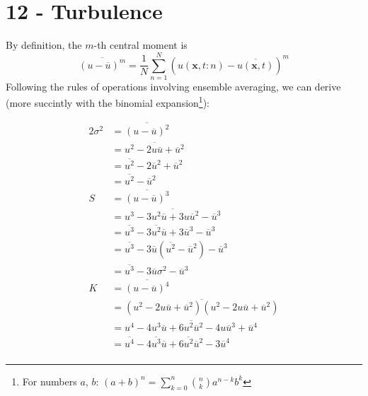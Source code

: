 \documentclass[a4paper]{article}
\begin{document}
\maketitle

\newpage
\tableofcontents

\newpage
\section{12 - Turbulence}


By definition, the \(m\)-th central moment is
\[
	\overline{\!\left( u - \overline{u} \right)^{m}} = \frac{1}{N} \sum_{n=1}^{N} \!\left( u \!\left( \bm{x}, t : n \right) - \overline{u \!\left( \bm{x}, t \right) } \right)^{m}
\]
Following the rules of operations involving ensemble averaging, we can derive (more succintly with the binomial expansion\footnote{For numbers \(a\), \(b\): \( (a + b)^n = \sum_{k=0}^{n} \binom{n}{k} a^{n-k} b^k \)}):

\begin{alignat*}{2}
	\sigma^{2} & = \overline{\!\left(u - \overline{u} \right)^{2}} \\
	     & = \overline{u^{2} - 2u \overline{u} + \overline{u}^{2} } \\
	     & = \overline{u^{2}} - 2 \overline{u}^{2} + \overline{u}^{2}  \\
	     & = \boxed{ \overline{u^{2}} - \overline{u}^{2} } \\
	   S & = \overline{\!\left( u - \overline{u} \right)^{3} }  \\
	     & = \overline{u^{3} - 3u^{2}\overline{u} + 3u \overline{u}^{2} - \overline{u}^{3}} \\
	     & = \overline{u^{3}} - 3 \overline{u^{2}} \overline{u} + 3 \overline{u}^{3} - \overline{u}^{3} \\
	     & = \overline{u^{3}} - 3 \overline{u} \!\left( \overline{u^{2}} - \overline{u}^{2} \right) - \overline{u}^{3} \\
	     & = \boxed{ \overline{u^{3}} - 3 \overline{u} \sigma^{2} - \overline{u}^{3} } \\
	   K & = \overline{\!\left( u - \overline{u} \right)^{4}} \\
	     & = \overline{\!\left( u^{2} - 2u \overline{u} + \overline{u}^{2} \right) \!\left( u^{2} - 2u \overline{u} + \overline{u}^{2} \right) } \\
	     & = \overline{u^{4} - 4u^{3} \overline{u} + 6u^{2} \overline{u}^{2} - 4u \overline{u}^{3} + \overline{u}^{4}} \\
	     & = \boxed{ \overline{u^{4}} - 4 \overline{u^{3}} \overline{u} + 6 \overline{u^{2}} \overline{u}^{2} - 3 \overline{u}^{4} } \\
\end{alignat*}
\end{document}
